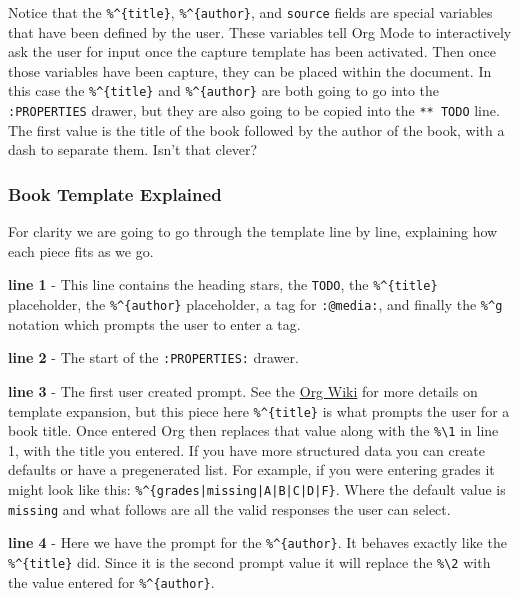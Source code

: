 \documentclass[11pt]{article}
\begin{document}
Notice that the \texttt{\%\textasciicircum{}\{title\}}, \texttt{\%\textasciicircum{}\{author\}}, and \texttt{source} fields are special variables that have been defined by the user. These variables tell Org Mode to interactively ask the user for input once the capture template has been activated. Then once those variables have been capture, they can be placed within the document. In this case the \texttt{\%\textasciicircum{}\{title\}} and \texttt{\%\textasciicircum{}\{author\}} are both going to go into the \texttt{:PROPERTIES} drawer, but they are also going to be copied into the \texttt{** TODO} line. The first value is the title of the book followed by the author of the book, with a dash to separate them. Isn't that clever?
\subsubsection*{Book Template Explained}
\label{sec:org7305cb7}
For clarity we are going to go through the template line by line, explaining how each piece fits as we go.

\textbf{line 1} - This line contains the heading stars, the \texttt{TODO}, the \texttt{\%\textasciicircum{}\{title\}} placeholder, the \texttt{\%\textasciicircum{}\{author\}} placeholder, a tag for \texttt{:@media:}, and finally the \texttt{\%\textasciicircum{}g} notation which prompts the user to enter a tag.

\textbf{line 2} - The start of the \texttt{:PROPERTIES:} drawer.

\textbf{line 3} - The first user created prompt. See the \href{https://orgmode.org/manual/Template-expansion.html}{Org Wiki} for more details on template expansion, but this piece here \texttt{\%\textasciicircum{}\{title\}} is what prompts the user for a book title. Once entered Org then replaces that value along with the \texttt{\%\textbackslash{}1} in line 1, with the title you entered. If you have more structured data you can create defaults or have a pregenerated list. For example, if you were entering grades it might look like this: \texttt{\%\textasciicircum{}\{grades|missing|A|B|C|D|F\}}. Where the default value is \texttt{missing} and what follows are all the valid responses the user can select.

\textbf{line 4} - Here we have the prompt for the \texttt{\%\textasciicircum{}\{author\}}. It behaves exactly like the \texttt{\%\textasciicircum{}\{title\}} did. Since it is the second prompt value it will replace the \texttt{\%\textbackslash{}2} with the value entered for \texttt{\%\textasciicircum{}\{author\}}.
\end{document}
